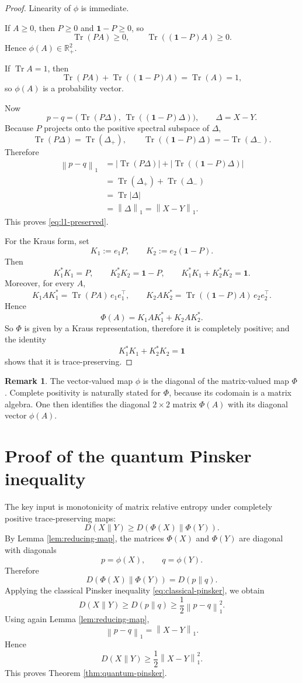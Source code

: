 \documentclass[11pt]{article}
\theoremstyle{definition}
\newtheorem{remark}{Remark}
\DeclareMathOperator{\Tr}{Tr}
\newcommand{\1}{\mathbf{1}}
\newcommand{\norm}[1]{\left\lVert #1 \right\rVert}
\begin{document}
\begin{proof}
Linearity of $\phi$ is immediate.

If $A\ge 0$, then $P\ge 0$ and $\1-P\ge 0$, so
\[
\Tr(PA)\ge 0,\qquad \Tr((\1-P)A)\ge 0.
\]
Hence $\phi(A)\in \mathbb{R}_+^2$.

If $\Tr A=1$, then
\[
\Tr(PA)+\Tr((\1-P)A)=\Tr(A)=1,
\]
so $\phi(A)$ is a probability vector.

Now
\[
p-q=\bigl(\Tr(P\Delta),\,\Tr((\1-P)\Delta)\bigr),
\qquad \Delta=X-Y.
\]
Because $P$ projects onto the positive spectral subspace of $\Delta$,
\[
\Tr(P\Delta)=\Tr(\Delta_+),
\qquad
\Tr((\1-P)\Delta)=-\Tr(\Delta_-).
\]
Therefore
\begin{align*}
\norm{p-q}_1
&=
\left|\Tr(P\Delta)\right|+\left|\Tr((\1-P)\Delta)\right| \\
&=
\Tr(\Delta_+)+\Tr(\Delta_-) \\
&=
\Tr|\Delta| \\
&=
\norm{\Delta}_1
=
\norm{X-Y}_1.
\end{align*}
This proves \eqref{eq:l1-preserved}.

For the Kraus form, set
\[
K_1:=e_1P,\qquad K_2:=e_2(\1-P).
\]
Then
\[
K_1^\ast K_1=P,\qquad K_2^\ast K_2=\1-P,
\qquad K_1^\ast K_1+K_2^\ast K_2=\1.
\]
Moreover, for every $A$,
\[
K_1AK_1^\ast=\Tr(PA)\,e_1e_1^\top,
\qquad
K_2AK_2^\ast=\Tr((\1-P)A)\,e_2e_2^\top.
\]
Hence
\[
\Phi(A)=K_1AK_1^\ast+K_2AK_2^\ast.
\]
So $\Phi$ is given by a Kraus representation, therefore it is completely positive; and the identity
\[
K_1^\ast K_1+K_2^\ast K_2=\1
\]
shows that it is trace-preserving.
\end{proof}

\begin{remark}
The vector-valued map $\phi$ is the diagonal of the matrix-valued map $\Phi$. Complete positivity is naturally stated for $\Phi$, because its codomain is a matrix algebra. One then identifies the diagonal $2\times2$ matrix $\Phi(A)$ with its diagonal vector $\phi(A)$.
\end{remark}

\section{Proof of the quantum Pinsker inequality}

The key input is monotonicity of matrix relative entropy under completely positive trace-preserving maps:
\[
D(X\|Y)\ge D(\Phi(X)\|\Phi(Y)).
\]
By Lemma \ref{lem:reducing-map}, the matrices $\Phi(X)$ and $\Phi(Y)$ are diagonal with diagonals
\[
p=\phi(X),\qquad q=\phi(Y).
\]
Therefore
\[
D(\Phi(X)\|\Phi(Y))=D(p\|q).
\]
Applying the classical Pinsker inequality \eqref{eq:classical-pinsker}, we obtain
\[
D(X\|Y)\ge D(p\|q)\ge \frac12 \norm{p-q}_1^2.
\]
Using again Lemma \ref{lem:reducing-map},
\[
\norm{p-q}_1=\norm{X-Y}_1.
\]
Hence
\[
D(X\|Y)\ge \frac12 \norm{X-Y}_1^2.
\]
This proves Theorem \ref{thm:quantum-pinsker}.
\end{document}
